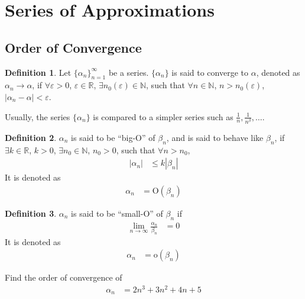 \documentclass[fleqn, a4paper, 12pt, twoside]{article}
\theoremstyle{definition}
\newtheorem{definition}{Definition}
\theoremstyle{theorem}
\begin{document}
\section{Series of Approximations}

\subsection{Order of Convergence}

\begin{definition}
	Let $\{\alpha_n\}_{n = 1}^{\infty}$ be a series.
	$\{\alpha_n\}$ is said to converge to $\alpha$, denoted as $\alpha_n \to \alpha$, if $\forall \varepsilon > 0$, $\varepsilon \in \mathbb{R}$, $\exists n_0(\varepsilon) \in \mathbb{N}$, such that $\forall n \in \mathbb{N}$, $n > n_0(\varepsilon)$, $|\alpha_n - \alpha| < \varepsilon$.
\end{definition}

Usually, the series $\{\alpha_n\}$ is compared to a simpler series such as $\frac{1}{n} , \frac{1}{n^{\beta}} , \dots$.

\begin{definition}
	$\alpha_n$ is said to be ``big-O'' of $\beta_n$, and is said to behave like $\beta_n$, if $\exists k \in \mathbb{R}$, $k > 0$, $\exists n_0 \in \mathbb{N}$, $n_0 > 0$, such that $\forall n > n_0$,
	\begin{align*}
		|\alpha_n| &\le k |\beta_n|
	\end{align*}
	It is denoted as
	\begin{align*}
		\alpha_n &= \mathrm{O}(\beta_n)
	\end{align*}
\end{definition}

\begin{definition}
	$\alpha_n$ is said to be ``small-O'' of $\beta_n$ if
	\begin{align*}
		\lim\limits_{n \to \infty} \frac{\alpha_n}{\beta_n} &= 0
	\end{align*}
	It is denoted as
	\begin{align*}
		\alpha_n &= \mathrm{o}(\beta_n)
	\end{align*}
\end{definition}

\begin{question}
	Find the order of convergence of
	\begin{align*}
		\alpha_n &= 2 n^3 + 3 n^2 + 4 n + 5
	\end{align*}
\end{question}
\end{document}
